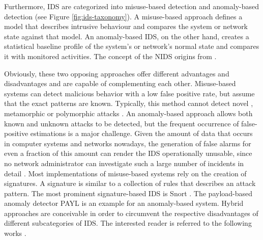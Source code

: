 \documentclass[../../../main.tex]{subfiles}
\begin{document}
Furthermore, IDS are categorized into misuse-based detection and anomaly-based detection (see Figure \ref{fig:ids-taxonomy}). A misuse-based approach defines a model that describes intrusive behaviour and compares the system or network state against that model. An anomaly-based IDS, on the other hand, creates a statistical baseline profile of the system’s or network’s normal state and compares it with monitored activities. The concept of the NIDS origins from \cite{denning1987intrusion}. 

Obviously, these two opposing approaches offer different advantages and disadvantages and are capable of complementing each other. Misuse-based systems can detect malicious behavior with a low false positive rate, but assume that the exact patterns  are known. Typically, this method cannot detect novel \cite[403]{whitman_principles_2018}, metamorphic or polymorphic attacks \cite[236]{szor2005art}. An anomaly-based approach allows both known and unknown attacks to be detected, but the frequent occurrence of false-positive estimations is a major challenge. Given the amount of data that occurs in computer systems and networks nowadays, the generation of false alarms for even a fraction of this amount can render the IDS operationally unusable, since no network administrator can investigate such a large number of incidents in detail \cite{axelsson2000base}. Most implementations of misuse-based systems rely on the creation of signatures. A signature is similar to a collection of rules that describes an attack pattern. The most prominent signature-based IDS is Snort \cite{roesch1999snort}. The payload-based anomaly detector PAYL \cite{wang2004anomalous} is an example for an anomaly-based system. Hybrid approaches are conceivable in order to circumvent the respective disadvantages of different subcategories of IDS. The interested reader is referred to the following works \cite{DEPREN2005713} \cite{zhang2006hybrid} \cite{beer_hybrid2021}.
\end{document}
